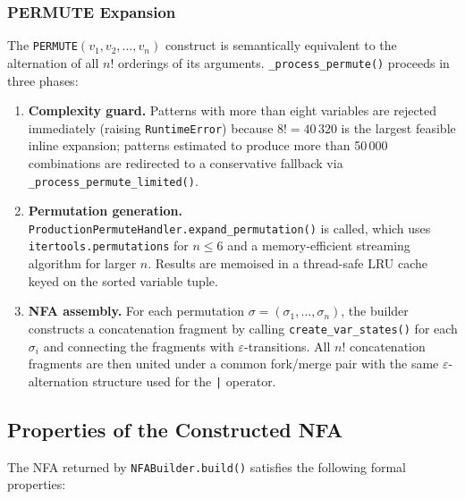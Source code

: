 \subsubsection{PERMUTE Expansion}
\label{subsubsec:meth-permute-expansion}

The \texttt{PERMUTE}$(v_1, v_2, \ldots, v_n)$ construct is
semantically equivalent to the alternation of all $n!$ orderings of
its arguments.  \texttt{\_process\_permute()} proceeds in three
phases:

\begin{enumerate}
  \item \textbf{Complexity guard.}  Patterns with more than eight
    variables are rejected immediately (raising
    \texttt{RuntimeError}) because $8! = 40\,320$ is the largest
    feasible inline expansion; patterns estimated to produce more
    than 50\,000 combinations are redirected to a conservative
    fallback via \texttt{\_process\_permute\_limited()}.
  \item \textbf{Permutation generation.}
    \texttt{ProductionPermuteHandler.expand\_permutation()} is called,
    which uses \texttt{itertools.per\-muta\-tions} for $n \leq 6$ and
    a memory-efficient streaming algorithm for larger $n$.  Results
    are memoised in a thread-safe LRU cache keyed on the sorted
    variable tuple.
  \item \textbf{NFA assembly.}  For each permutation
    $\sigma = (\sigma_1, \ldots, \sigma_n)$, the builder constructs
    a concatenation fragment by calling
    \texttt{create\_var\_states()} for each $\sigma_i$ and connecting
    the fragments with $\varepsilon$-transitions.  All $n!$
    concatenation fragments are then united under a common fork/merge
    pair with the same $\varepsilon$-alternation structure used for
    the \texttt{|} operator.
\end{enumerate}

\subsection{Properties of the Constructed NFA}
\label{subsec:meth-nfa-properties}

The NFA returned by \texttt{NFABuilder.build()} satisfies the
following formal properties:

